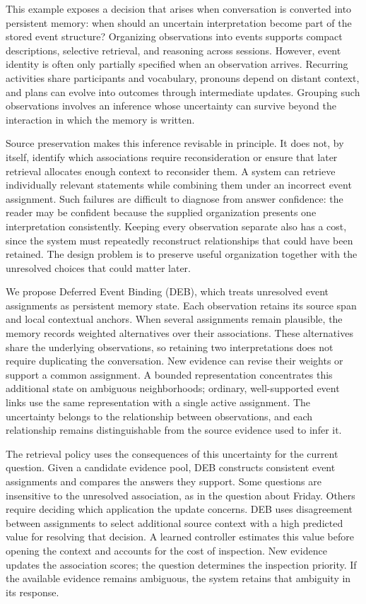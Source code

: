 This example exposes a decision that arises when conversation is converted into persistent memory: when should an uncertain interpretation become part of the stored event structure? Organizing observations into events supports compact descriptions, selective retrieval, and reasoning across sessions. However, event identity is often only partially specified when an observation arrives. Recurring activities share participants and vocabulary, pronouns depend on distant context, and plans can evolve into outcomes through intermediate updates. Grouping such observations involves an inference whose uncertainty can survive beyond the interaction in which the memory is written.

Source preservation makes this inference revisable in principle. It does not, by itself, identify which associations require reconsideration or ensure that later retrieval allocates enough context to reconsider them. A system can retrieve individually relevant statements while combining them under an incorrect event assignment. Such failures are difficult to diagnose from answer confidence: the reader may be confident because the supplied organization presents one interpretation consistently. Keeping every observation separate also has a cost, since the system must repeatedly reconstruct relationships that could have been retained. The design problem is to preserve useful organization together with the unresolved choices that could matter later.

We propose Deferred Event Binding (DEB), which treats unresolved event assignments as persistent memory state. Each observation retains its source span and local contextual anchors. When several assignments remain plausible, the memory records weighted alternatives over their associations. These alternatives share the underlying observations, so retaining two interpretations does not require duplicating the conversation. New evidence can revise their weights or support a common assignment. A bounded representation concentrates this additional state on ambiguous neighborhoods; ordinary, well-supported event links use the same representation with a single active assignment. The uncertainty belongs to the relationship between observations, and each relationship remains distinguishable from the source evidence used to infer it.

The retrieval policy uses the consequences of this uncertainty for the current question. Given a candidate evidence pool, DEB constructs consistent event assignments and compares the answers they support. Some questions are insensitive to the unresolved association, as in the question about Friday. Others require deciding which application the update concerns. DEB uses disagreement between assignments to select additional source context with a high predicted value for resolving that decision. A learned controller estimates this value before opening the context and accounts for the cost of inspection. New evidence updates the association scores; the question determines the inspection priority. If the available evidence remains ambiguous, the system retains that ambiguity in its response.

